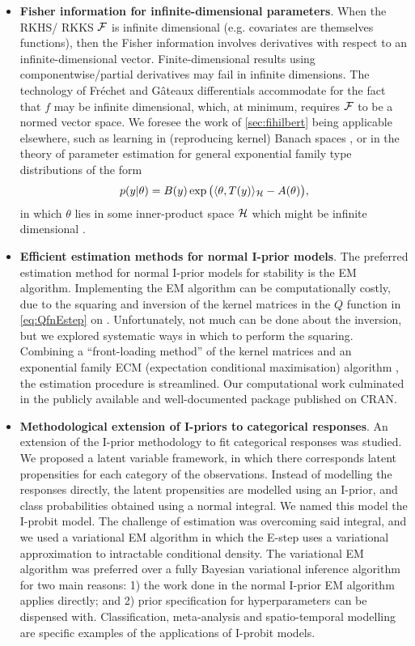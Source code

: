 \documentclass[11pt,twoside,openright]{report}
\begin{document}
\begin{itemize}
  \item \textbf{Fisher information for infinite-dimensional parameters}. 
  When the RKHS/ RKKS ${\mathcal F}$ is infinite dimensional (e.g. covariates are themselves functions), then the Fisher information involves derivatives with respect to an infinite-dimensional vector.
  Finite-dimensional results using componentwise/partial derivatives may fail in infinite dimensions.
  The technology of Fréchet and Gâteaux differentials accommodate for the fact that $f$ may be infinite dimensional, which, at minimum, requires ${\mathcal F}$ to be a  normed vector space. 
  We foresee the work of \cref{sec:fihilbert} being applicable elsewhere, such as learning in (reproducing kernel) Banach spaces \citep{zhang2009reproducing,zhang2012regularized}, or in the theory of parameter estimation for general exponential family type distributions of the form
  \[
    p(y|\theta) = B(y)\exp\big(\langle\theta,T(y)\rangle_{\mathcal H} - A(\theta) \big),
  \]
  in which $\theta$ lies in some inner-product space ${\mathcal H}$ which might be infinite dimensional \citep{sriperumbudur2013density}.
  
  \item \textbf{Efficient estimation methods for normal I-prior models}. 
  The preferred estimation method for normal I-prior models for stability is the EM algorithm.
  Implementing the EM algorithm can be computationally costly, due to the squaring and inversion of the kernel matrices in the $Q$ function in \cref{eq:QfnEstep} on .
  Unfortunately, not much can be done about the inversion, but we explored systematic ways in which to perform the squaring.
  Combining a ``front-loading method'' of the kernel matrices  and an exponential family ECM (expectation conditional maximisation) algorithm \citep{meng1993maximum}, the estimation procedure is streamlined.
  Our computational work culminated in the publicly available and well-documented  package  \citep{jamil2017iprior} published on CRAN.
  
  \item \textbf{Methodological extension of I-priors to categorical responses}.
  An extension of the I-prior methodology to fit categorical responses was studied.
  We proposed a latent variable framework, in which there corresponds latent propensities for each category of the observations.
  Instead of modelling the responses directly, the latent propensities are modelled using an I-prior, and class probabilities obtained using a normal integral.
  We named this model the I-probit model.
  The challenge of estimation was overcoming said integral, and we used a variational EM algorithm in which the E-step uses a variational approximation to intractable conditional density.
  The variational EM algorithm was preferred over a fully Bayesian variational inference algorithm for two main reasons: 1) the work done in the normal I-prior EM algorithm applies directly; and 2) prior specification for hyperparameters can be dispensed with.
  Classification, meta-analysis and spatio-temporal modelling are specific examples of the applications of I-probit models.
  

\end{itemize}
\end{document}
